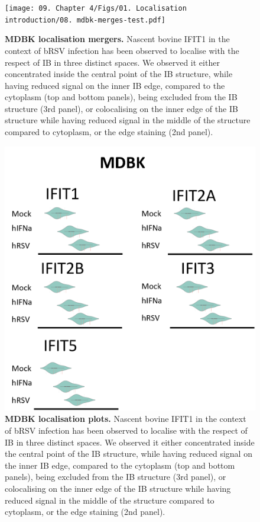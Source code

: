 \begin{figure}
    \centering
    \texttt{[image: 09. Chapter 4/Figs/01. Localisation introduction/08. mdbk-merges-test.pdf]}
    \caption[MDBK localisation mergers.]{\textbf{MDBK localisation mergers.} Nascent bovine IFIT1 in the context of bRSV infection has been observed to localise with the respect of IB in three distinct spaces. We observed it either concentrated inside the central point of the IB structure, while having reduced signal on the inner IB edge, compared to the cytoplasm (top and bottom panels), being excluded from the IB structure (3rd panel), or colocalising on the inner edge of the IB structure while having reduced signal in the middle of the structure compared to cytoplasm, or the edge staining (2nd panel).}
    \label{fig:MDBK localisation mergers}
\end{figure}


\begin{figure}
    \centering
    \includegraphics[width=1\linewidth]{09. Chapter 4/Figs/01. Localisation introduction/09. mdbk plots.png}
    \caption[MDBK localisation plots.]{\textbf{MDBK localisation plots.} Nascent bovine IFIT1 in the context of bRSV infection has been observed to localise with the respect of IB in three distinct spaces. We observed it either concentrated inside the central point of the IB structure, while having reduced signal on the inner IB edge, compared to the cytoplasm (top and bottom panels), being excluded from the IB structure (3rd panel), or colocalising on the inner edge of the IB structure while having reduced signal in the middle of the structure compared to cytoplasm, or the edge staining (2nd panel).}
    \label{fig:MDBK localisation plots}
\end{figure}
